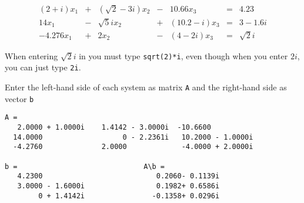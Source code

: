 \documentclass{ximera}
\begin{document}
\begin{computerExercise} \label{c2.5.2c}
\[
\begin{array}{rcrcrcr}
 (2+i) x_1 & + & (\sqrt{2}-3i)x_2 & - &    10.66 x_3 & = &     4.23 \\
    14 x_1 & - &    \sqrt{5}i x_2 & + & (10.2-i) x_3 & = &    3-1.6i \\
-4.276 x_1 & + &            2 x_2 & - &   (4-2i) x_3 & = & \sqrt{2}i
\end{array}
\]

  When entering $\sqrt{2}i$ in \Matlab you must type
{\tt sqrt(2)*i}, even though when you enter $2i$, you can just type
{\tt 2i}.

\begin{solution}

Enter the left-hand side of each system as matrix {\tt A} 
and the right-hand side as vector {\tt b}

\begin{verbatim}
A =
   2.0000 + 1.0000i    1.4142 - 3.0000i  -10.6600
  14.0000                   0 - 2.2361i   10.2000 - 1.0000i
  -4.2760              2.0000             -4.0000 + 2.0000i

b =                              A\b =
   4.2300                           0.2060- 0.1139i
   3.0000 - 1.6000i                 0.1982+ 0.6586i
        0 + 1.4142i                -0.1358+ 0.0296i
\end{verbatim}























\end{solution}
\end{computerExercise}
\end{document}
